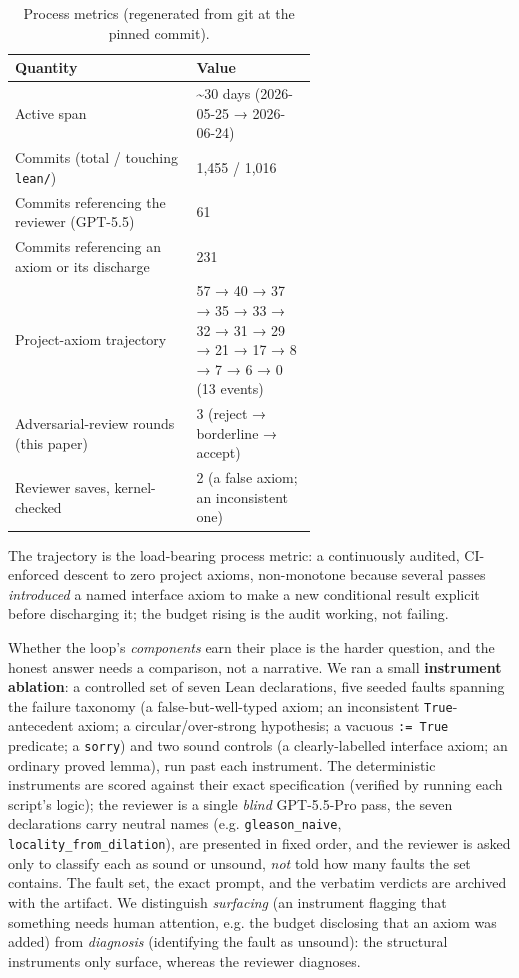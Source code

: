 \documentclass[11pt]{article}
\begin{document}
\begin{table}[ht]
\centering
\caption{Process metrics (regenerated from git at the pinned commit).}
\begin{tabularx}{\linewidth}{@{}>{\raggedright\arraybackslash}p{0.60\linewidth}Y@{}}
\toprule
\textbf{Quantity} & \textbf{Value} \\
\midrule
Active span & \textasciitilde{}30 days (2026-05-25 → 2026-06-24) \\
Commits (total / touching \texttt{lean/}) & 1,455 / 1,016 \\
Commits referencing the reviewer (GPT-5.5) & 61 \\
Commits referencing an axiom or its discharge & 231 \\
Project-axiom trajectory & 57 → 40 → 37 → 35 → 33 → 32 → 31 → 29 → 21 → 17 → 8 → 7 → 6 → 0 (13 events) \\
Adversarial-review rounds (this paper) & 3 (reject → borderline → accept) \\
Reviewer saves, kernel-checked & 2 (a false axiom; an inconsistent one) \\
\bottomrule
\end{tabularx}
\end{table}

The trajectory is the load-bearing process metric: a continuously audited, CI-enforced descent to
zero project axioms, non-monotone because several passes \emph{introduced} a named interface axiom to make
a new conditional result explicit before discharging it; the budget rising is the audit working, not
failing.

Whether the loop's \emph{components} earn their place is the harder question, and the honest answer needs
a comparison, not a narrative. We ran a small \textbf{instrument ablation}: a controlled set of seven Lean
declarations, five seeded faults spanning the failure taxonomy (a false-but-well-typed axiom; an
inconsistent \texttt{True}-antecedent axiom; a circular/over-strong hypothesis; a vacuous \texttt{:= True}
predicate; a \texttt{sorry}) and two sound controls (a clearly-labelled interface axiom; an ordinary proved
lemma), run past each instrument. The deterministic instruments are scored against their exact
specification (verified by running each script's logic); the reviewer is a single \emph{blind}
GPT-5.5-Pro pass, the seven declarations carry neutral names (e.g. \texttt{gleason\_naive},
\texttt{locality\_from\_dilation}), are presented in fixed order, and the reviewer is asked only to classify
each as sound or unsound, \emph{not} told how many faults the set contains. The fault set, the exact
prompt, and the verbatim verdicts are archived with the artifact. We distinguish \emph{surfacing} (an
instrument flagging that something needs human attention, e.g. the budget disclosing that an axiom
was added) from \emph{diagnosis} (identifying the fault as unsound): the structural instruments only
surface, whereas the reviewer diagnoses.
\end{document}
